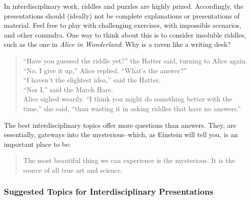 \documentclass[letterpaper,10pt,headsepline]{scrreprt}
\begin{document}
In interdisciplinary work, riddles and puzzles are highly prized. Accordingly, the presentations should (ideally) not be complete explanations or presentations of material. Feel free to play with challenging exercises, with impossible scenarios, and other conundra. One way to think about this is to consider insoluble riddles, such as the one in \textit{Alice in Wonderland}: Why is a raven like a
writing desk?

\begin{quote}
  ``Have you guessed the riddle yet?'' the Hatter said, turning to Alice again.\\
``No, I give it up,'' Alice replied. ``What's the answer?''\\
``I haven't the slightest idea,'' said the Hatter.\\
``Nor I,'' said the March Hare.\\
Alice sighed wearily. ``I think you might do something better with the time,'' she said, ``than wasting it in asking riddles that have no answers.''
\end{quote}

The best interdisciplinary topics offer more questions than answers. They, are essentially, gateways into the mysterious--which, as Einstein will tell you, is an important place to be:

\begin{quote}
  The most beautiful thing we can experience is the mysterious. It is
  the source of all true art and science.
\end{quote}

\subsubsection{Suggested Topics for Interdisciplinary Presentations}
\end{document}
